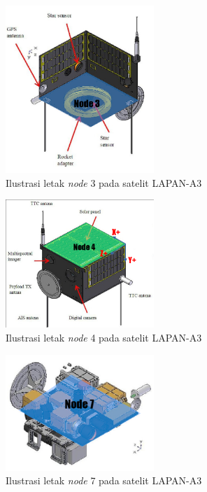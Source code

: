 \begin{figure}[H]
\setlength{}
\begin{center}
\includegraphics[width=0.5\textwidth]{fig/node3.png}
	\caption{Ilustrasi letak \textit{node} 3 pada satelit LAPAN-A3}
\label{fig:node3}
\end{center}
\end{figure}

\begin{figure}[H]
\setlength{}
\begin{center}
\includegraphics[width=0.5\textwidth]{fig/node4.png}
	\caption{Ilustrasi letak \textit{node} 4 pada satelit LAPAN-A3}
\label{fig:node4}
\end{center}
\end{figure}

\begin{figure}[H]
\setlength{}
\begin{center}
\includegraphics[width=0.5\textwidth]{fig/node7.png}
	\caption{Ilustrasi letak \textit{node} 7 pada satelit LAPAN-A3}
\label{fig:node7}
\end{center}
\end{figure}

